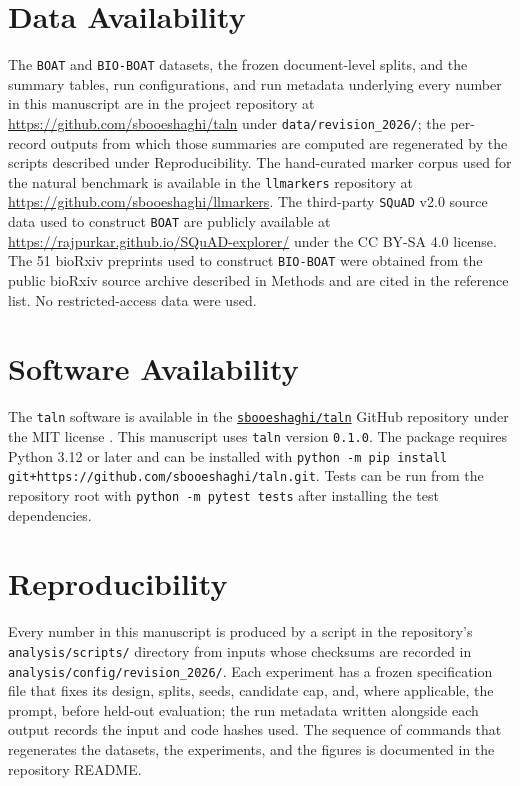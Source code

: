 \documentclass[10pt,twocolumn]{article}
\theoremstyle{plain}
\theoremstyle{definition}
\theoremstyle{remark}
\begin{document}
\section{Data Availability}
The \texttt{BOAT} and \texttt{BIO-BOAT} datasets, the frozen document-level splits, and the summary tables, run configurations, and run metadata underlying every number in this manuscript are in the project repository at \href{https://github.com/sbooeshaghi/taln}{https://github.com/sbooeshaghi/taln} under \texttt{data/revision\_2026/}; the per-record outputs from which those summaries are computed are regenerated by the scripts described under Reproducibility. The hand-curated marker corpus used for the natural benchmark is available in the \texttt{llmarkers} repository at \href{https://github.com/sbooeshaghi/llmarkers}{https://github.com/sbooeshaghi/llmarkers}. The third-party \texttt{SQuAD} v2.0 source data used to construct \texttt{BOAT} are publicly available at \href{https://rajpurkar.github.io/SQuAD-explorer/}{https://rajpurkar.github.io/SQuAD-explorer/} under the CC BY-SA 4.0 license. The 51 bioRxiv preprints used to construct \texttt{BIO-BOAT} were obtained from the public bioRxiv source archive described in Methods and are cited in the reference list. No restricted-access data were used.

\section{Software Availability}
The \texttt{taln} software is available in the \href{https://github.com/sbooeshaghi/taln}{\texttt{sbooeshaghi/taln}} GitHub repository under the MIT license \citep{Booeshaghi_taln_software}. This manuscript uses \texttt{taln} version \texttt{0.1.0}. The package requires Python 3.12 or later and can be installed with \texttt{python -m pip install git+https://github.com/sbooeshaghi/taln.git}. Tests can be run from the repository root with \texttt{python -m pytest tests} after installing the test dependencies.

\section{Reproducibility}
Every number in this manuscript is produced by a script in the repository's \texttt{analysis/scripts/} directory from inputs whose checksums are recorded in \texttt{analysis/config/revision\_2026/}. Each experiment has a frozen specification file that fixes its design, splits, seeds, candidate cap, and, where applicable, the prompt, before held-out evaluation; the run metadata written alongside each output records the input and code hashes used. The sequence of commands that regenerates the datasets, the experiments, and the figures is documented in the repository README.
\end{document}
